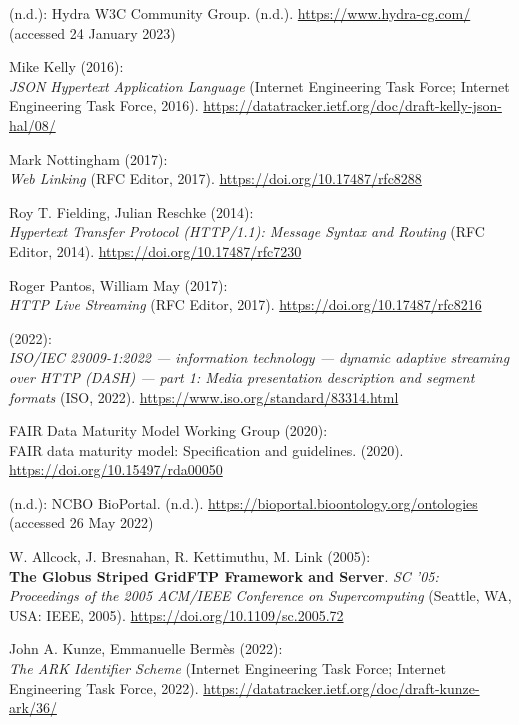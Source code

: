 \begin{thebibliography}{9}
{
(n.d.): Hydra {W3C Community Group}. (n.d.).
\url{https://www.hydra-cg.com/} (accessed 24 January 2023)

Mike Kelly (2016): \\
\emph{{JSON Hypertext Application Language}}
(Internet Engineering Task Force; Internet Engineering Task Force,
2016). \url{https://datatracker.ietf.org/doc/draft-kelly-json-hal/08/}

Mark Nottingham (2017): \\
\emph{Web {Linking}} ({RFC Editor}, 2017).
\url{https://doi.org/10.17487/rfc8288}

Roy T. Fielding, Julian Reschke (2014): \\
\emph{Hypertext {Transfer
Protocol} ({HTTP}/1.1): {Message Syntax} and {Routing}} ({RFC Editor},
2014).
\url{https://doi.org/10.17487/rfc7230}

Roger Pantos, William May (2017): \\
\emph{{HTTP Live Streaming}} ({RFC
Editor}, 2017).
\url{https://doi.org/10.17487/rfc8216}

(2022): \\
\emph{{ISO}/{IEC} 23009-1:2022 --- information technology ---
dynamic adaptive streaming over HTTP (DASH) --- part 1: Media
presentation description and segment formats} ({ISO}, 2022).
\url{https://www.iso.org/standard/83314.html}

FAIR Data Maturity Model Working Group (2020): \\
{FAIR} data maturity
model: {Specification} and guidelines. (2020).
\url{https://doi.org/10.15497/rda00050}

(n.d.): {NCBO BioPortal}. (n.d.).
\url{https://bioportal.bioontology.org/ontologies} (accessed 26 May
2022)

W. Allcock, J. Bresnahan, R. Kettimuthu, M. Link (2005): \\
\textbf{The
{Globus Striped GridFTP Framework} and {Server}}. \emph{{SC '05:
Proceedings of the 2005 ACM/IEEE Conference on Supercomputing}}
({Seattle, WA, USA}: {IEEE}, 2005).
\url{https://doi.org/10.1109/sc.2005.72}

John A. Kunze, Emmanuelle Bermès (2022): \\
\emph{{The ARK Identifier
Scheme}} (Internet Engineering Task Force; Internet Engineering Task
Force, 2022). \url{https://datatracker.ietf.org/doc/draft-kunze-ark/36/}

}
\end{thebibliography}
